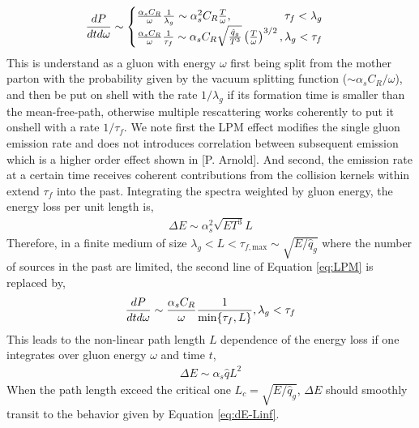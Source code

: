 \documentclass[aps, prc, reprint, amsmath, groupedaddress, nofootinbib]{revtex4-1}
\begin{document}
\begin{eqnarray}\label{eq:LPM}
\frac{dP}{dt d\omega} \sim \begin{cases}
 \frac{\alpha_s C_R}{\omega} \frac{1}{\lambda_g} \sim \alpha_s^2 C_R \frac{T}{\omega}, \hfill \tau_f < \lambda_g\\
 \frac{\alpha_s C_R}{\omega} \frac{1}{\tau_f}\sim \alpha_s C_R \sqrt{\frac{\hat{q}_g}{T^3}} \left(\frac{T}{\omega}\right)^{3/2}, \hfill \lambda_g < \tau_f
\end{cases}
\end{eqnarray}
This is understand as a gluon with energy $\omega$ first being split from the mother parton with the probability given by the vacuum splitting function ($\sim \alpha_s C_R/\omega$), and then be put on shell with the rate $1/\lambda_g$ if its formation time is smaller than the mean-free-path, otherwise multiple rescattering works coherently to put it onshell with a rate $1/\tau_f$. 
We note first the LPM effect modifies the single gluon emission rate and does not introduces correlation between subsequent emission which is a higher order effect shown in [P. Arnold].
And second, the emission rate at a certain time receives coherent contributions from the collision kernels within extend $\tau_f$ into the past.
Integrating the spectra weighted by gluon energy, the energy loss per unit length is,
\begin{eqnarray}\label{eq:dE-Linf}
\Delta E \sim \alpha_s^2 \sqrt{ET^3} L
\end{eqnarray}
Therefore, in a finite medium of size $\lambda_g < L< \tau_{f,\textrm{max}} \sim \sqrt{E/\hat{q}_g}$ where the number of sources in the past are limited, the second line of Equation \ref{eq:LPM} is replaced by,
\begin{eqnarray}
\frac{dP}{dt d\omega} \sim 
 \frac{\alpha_s C_R}{\omega} \frac{1}{\min\{\tau_f,L\}}, \hfill \lambda_g < \tau_f
\end{eqnarray}
This leads to the non-linear path length $L$ dependence of the energy loss if one integrates over gluon energy $\omega$ and time $t$,
\begin{eqnarray}\label{eq:dE-Lfinite}
\Delta E \sim \alpha_s \hat{q} L^2
\end{eqnarray}
When the path length exceed the critical one $L_c = \sqrt{E/\hat{q}_g}$, $\Delta E$ should smoothly transit to the behavior given by Equation \ref{eq:dE-Linf}.
\end{document}
